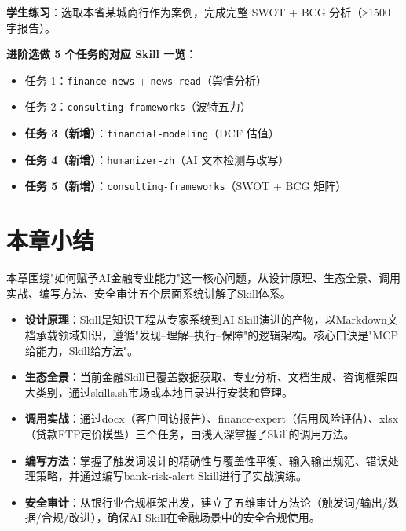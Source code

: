 \textbf{学生练习}：选取本省某城商行作为案例，完成完整 SWOT + BCG 分析（≥1500 字报告）。

\textbf{进阶选做 5 个任务的对应 Skill 一览}：
\begin{itemize}[leftmargin=1em]
  \item 任务 1：\texttt{finance-news} + \texttt{news-read}（舆情分析）
  \item 任务 2：\texttt{consulting-frameworks}（波特五力）
  \item \textbf{任务 3（新增）}：\texttt{financial-modeling}（DCF 估值）
  \item \textbf{任务 4（新增）}：\texttt{humanizer-zh}（AI 文本检测与改写）
  \item \textbf{任务 5（新增）}：\texttt{consulting-frameworks}（SWOT + BCG 矩阵）
\end{itemize}

\section*{本章小结}


本章围绕"如何赋予AI金融专业能力"这一核心问题，从设计原理、生态全景、调用实战、编写方法、安全审计五个层面系统讲解了Skill体系。

\begin{itemize}[leftmargin=2em]
  \item \textbf{设计原理}：Skill是知识工程从专家系统到AI Skill演进的产物，以Markdown文档承载领域知识，遵循"发现--理解--执行--保障"的逻辑架构。核心口诀是"MCP给能力，Skill给方法"。
  \item \textbf{生态全景}：当前金融Skill已覆盖数据获取、专业分析、文档生成、咨询框架四大类别，通过skills.sh市场或本地目录进行安装和管理。
  \item \textbf{调用实战}：通过docx（客户回访报告）、finance-expert（信用风险评估）、xlsx（贷款FTP定价模型）三个任务，由浅入深掌握了Skill的调用方法。
  \item \textbf{编写方法}：掌握了触发词设计的精确性与覆盖性平衡、输入输出规范、错误处理策略，并通过编写bank-risk-alert Skill进行了实战演练。
  \item \textbf{安全审计}：从银行业合规框架出发，建立了五维审计方法论（触发词/输出/数据/合规/改进），确保AI Skill在金融场景中的安全合规使用。
\end{itemize}


